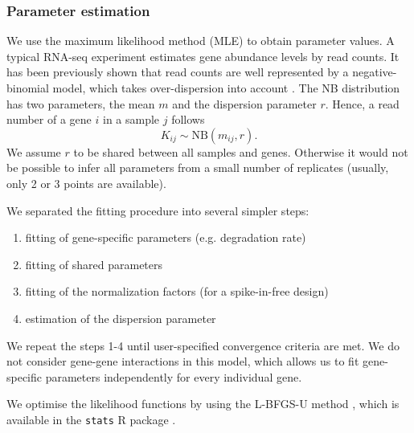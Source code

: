 \subsubsection*{Parameter estimation}
We use the maximum likelihood method (MLE) to obtain parameter values.
A typical RNA-seq experiment estimates gene abundance levels by read counts.
It has been previously shown that read counts are well represented by a negative-binomial model,
which takes over-dispersion into account 
\citep{robinson2007moderated}.
The NB distribution has two parameters, the mean $m$ and the dispersion parameter 
$r$.
Hence,  a read number of a gene $i$ in a sample $j$ follows
\begin{equation}
 K_{ij} \sim \text{NB}(m_{ij}, r).
\end{equation}
We assume $r$ to be shared between all
samples and genes. Otherwise it would not be possible to infer all parameters 
from a small number of replicates (usually, only 2 or 3 points are available).

We separated the fitting procedure into several simpler steps:
\begin{enumerate}
 \item fitting of gene-specific parameters (e.g. degradation rate)
 \item fitting of shared parameters  
 \item fitting of the normalization factors (for a spike-in-free design)
 \item estimation of the dispersion parameter 
\end{enumerate}
We repeat the steps 1-4 until user-specified convergence criteria are met.
We do not consider gene-gene interactions in this model, which 
allows us to  fit gene-specific parameters independently for every individual gene. 

We optimise the likelihood functions by using the {L-BFGS-U} method \citep{byrd1995limited}, which is
available in the \verb|stats| R package \citep{rlang}.